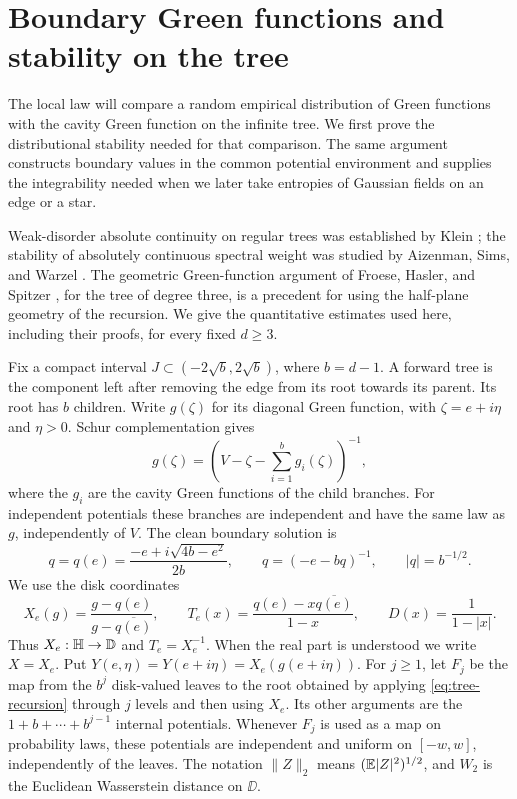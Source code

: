\section{Boundary Green functions and stability on the tree}\label{sec:tree}

The local law will compare a random empirical distribution of Green
functions with the cavity Green function on the infinite tree.  We first
prove the distributional stability needed for that comparison.  The same
argument constructs boundary values in the common potential environment
and supplies the integrability needed when we later take entropies of
Gaussian fields on an edge or a star.

Weak-disorder absolute continuity on regular trees was established by
Klein \cite{Klein1998}; the stability of absolutely continuous spectral
weight was studied by Aizenman, Sims, and Warzel \cite{ASW2006}.
The geometric Green-function argument of Froese, Hasler, and Spitzer
\cite{FHS2007}, for the tree of degree three, is a precedent for using the
half-plane geometry of the recursion.  We give the quantitative estimates
used here, including their proofs, for every fixed $d\ge3$.

Fix a compact interval $J\subset(-2\sqrt b,2\sqrt b)$, where $b=d-1$.
A forward tree is the component left after removing the edge from its
root towards its parent.  Its root has $b$ children.  Write $g(\zeta)$
for its diagonal Green function, with $\zeta=e+i\eta$ and $\eta>0$.
Schur complementation gives
\begin{equation}\label{eq:tree-recursion}
 g(\zeta)=\left(V-\zeta-\sum_{i=1}^b g_i(\zeta)\right)^{-1},
\end{equation}
where the $g_i$ are the cavity Green functions of the child branches.
For independent potentials these branches are independent and have the
same law as $g$, independently of $V$.  The clean boundary solution is
\[
 q=q(e)=\frac{-e+i\sqrt{4b-e^2}}{2b},
 \qquad q=(-e-bq)^{-1},\qquad |q|=b^{-1/2}.
\]
We use the disk coordinates
\begin{equation}\label{eq:tree-disk}
 X_e(g)=\frac{g-q(e)}{g-\overline{q(e)}},\qquad
 T_e(x)=\frac{q(e)-x\overline{q(e)}}{1-x},\qquad
 D(x)=\frac1{1-|x|}.
\end{equation}
Thus $X_e:\mathbb H\to\mathbb D$ and $T_e=X_e^{-1}$.  When the real part is
understood we write $X=X_e$.  Put
$Y(e,\eta)=Y(e+i\eta)=X_e(g(e+i\eta))$.  For $j\ge1$, let $F_j$ be the map from
the $b^j$ disk-valued leaves to the root obtained by applying
\eqref{eq:tree-recursion} through $j$ levels and then using $X_e$.
Its other arguments are the $1+b+\cdots+b^{j-1}$ internal potentials.
Whenever $F_j$ is used as a map on probability laws, these potentials
are independent and uniform on $[-w,w]$, independently of the leaves.
The notation $\|Z\|_2$ means $(\mathbb E|Z|^2)^{1/2}$, and $W_2$ is the
Euclidean Wasserstein distance on $\DD$.

